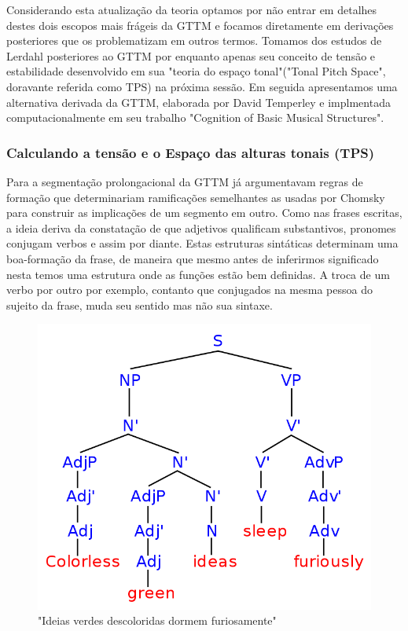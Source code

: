 \documentclass[
	12pt,				%
	openright,			%
	twoside,			%
	a4paper,			%
	english,			%
	french,				%
	spanish,			%
	brazil				%
	]{abntex2}
\begin{document}
Considerando esta atualização da teoria optamos por não entrar em detalhes destes dois escopos mais frágeis da GTTM e focamos diretamente em derivações posteriores que os problematizam em outros termos. Tomamos dos estudos de Lerdahl posteriores ao GTTM  por enquanto apenas seu conceito de tensão e estabilidade desenvolvido em sua "teoria do espaço tonal"("Tonal Pitch Space", doravante referida como TPS) na próxima sessão. Em seguida apresentamos uma alternativa derivada da GTTM, elaborada por David Temperley e implmentada computacionalmente em seu trabalho "Cognition of Basic Musical Structures"\cite{temperley2004cognition}.



\pagebreak
\subsubsection{Calculando a tensão e o Espaço das alturas tonais (TPS) }


Para a segmentação prolongacional da GTTM  já argumentavam regras de formação que determinariam ramificações semelhantes as usadas por Chomsky\cite{chomsky1957syntactic} para construir as implicações de um segmento em outro. Como nas frases escritas, a ideia deriva da constatação de que adjetivos qualificam substantivos, pronomes conjugam verbos e assim por diante. Estas estruturas sintáticas determinam uma boa-formação da frase, de maneira que mesmo antes de inferirmos significado nesta temos uma estrutura onde as funções estão bem definidas. A troca de um verbo por outro por exemplo, contanto que conjugados na mesma pessoa do sujeito da frase, muda seu sentido mas não sua sintaxe.

\begin{figure}[!h]
	\caption{\label{fig_grafico}"Ideias verdes descoloridas dormem furiosamente"\cite{chomsky1957syntactic}}
	\begin{center}
	    \includegraphics[scale=0.45]{gttm/colorless.png}
	\end{center}
\end{figure}
\end{document}

